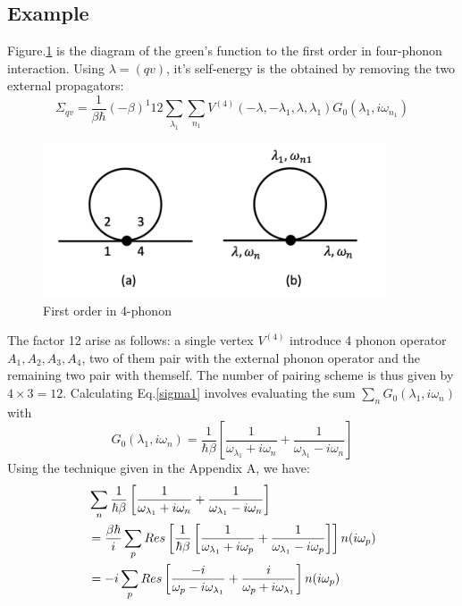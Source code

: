 \documentclass{article}
\begin{document}
\subsection{Example}
Figure.\ref{diagram1} is the diagram of the green's function to the 
first order in four-phonon interaction. Using $\lambda = (qv)$, it's self-energy is the obtained
by removing the two external propagators:
\begin{equation}
    \Sigma_{qv} = \frac{1}{\beta\hbar} (-\beta)^1 12 \sum_{\lambda_1}\sum_{n_1} V^{(4)}(-\lambda,-\lambda_1,\lambda,\lambda_1) G_0(\lambda_1,i\omega_{n_1}) \label{sigma1}
\end{equation} 
\begin{figure}[h!]
    \centering
    \includegraphics[width=4in]{img/self.energy.1.png}
    \caption{First order in 4-phonon}
    \label{diagram1}
\end{figure}
The factor 12 arise as follows: a single vertex $V^{(4)}$ introduce 4 phonon operator $A_1, A_2, A_3, A_4$, two of them pair
with the external phonon operator and the remaining two pair with themself. 
The number of pairing scheme is thus given by $4\times 3 = 12$.
Calculating Eq.\ref{sigma1} involves evaluating the sum $\sum_{n} G_0(\lambda_1,i\omega_{n})$ with
\begin{equation}
    G_0(\lambda_1,i\omega_{n}) = \frac{1}{\hbar\beta} \left[ \frac{1}{\omega_{\lambda_1}+i\omega_n} + \frac{1}{\omega_{\lambda_1}-i\omega_n} \right]
\end{equation}
Using the technique given in the Appendix A, we have:
\begin{align}
    &\sum_n \frac{1}{\hbar\beta} \left[ \frac{1}{\omega_{\lambda_1}+i\omega_n} + \frac{1}{\omega_{\lambda_1}-i\omega_n} \right] \notag \\
    &= \frac{\beta\hbar}{i} \sum_{p} Res\left[\frac{1}{\hbar\beta} \left[ \frac{1}{\omega_{\lambda_1}+i\omega_p} + \frac{1}{\omega_{\lambda_1}-i\omega_p} \right]\right] n(i\omega_p) \notag \\
    &= -i \sum_{p} Res\left[ \frac{-i}{\omega_p - i\omega_{\lambda_1}} + \frac{i}{\omega_p+i\omega_{\lambda_1}} \right] n(i\omega_p) \notag \\
\end{align}
\end{document}
